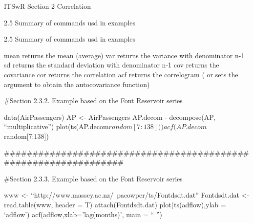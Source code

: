 ITSwR Section 2 Correlation

2.5 Summary of commands usd in examples

2.5 Summary of commands usd in examples
 
mean returns the mean (average)
var returns the variance with denominator n-1
sd returns the standard deviation with denominator n-1
cov returns the covariance
cor returns the correlation
acf returns the correlogram ( or sets the argument to obtain the autocovariance function)




#Section 2.3.2. Example based on the Font Reservoir series

data(AirPassengers)
AP <- AirPassengers
AP.decom - decompose(AP, “multiplicative”)
plot(ts(AP.decom$random[7:138]))
acf(AP.decom$random[7:138])

################################################################

#Section 2.3.3. Example based on the Font Reservoir series

www <- “http://www.massey.ac.nz/~pacowper/ts/Fontdsdt.dat”
Fontdsdt.dat <- read.table(www, header = T)
attach(Fontdsdt.dat)
plot(ts(adflow),ylab = ‘adflow’)
acf(adflow,xlab=’lag(months)’, main = “ ”)
